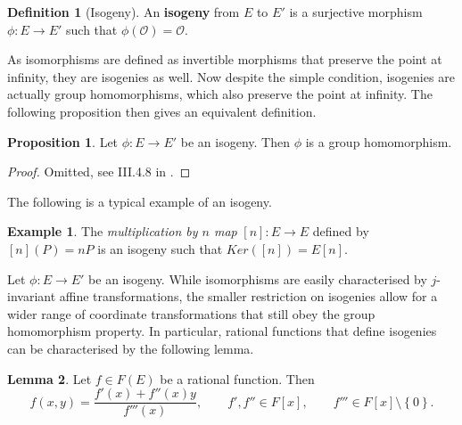 \documentclass{article}
\newcommand{\rb}[1]{\left( #1 \right)}
\renewcommand{\sb}[1]{\left[ #1 \right]}
\newcommand{\cb}[1]{\left\{ #1 \right\}}
\theoremstyle{definition}\newtheorem*{definition}{Definition}
\theoremstyle{definition}\newtheorem*{example}{Example}
\theoremstyle{definition}\newtheorem*{remark}{Remark}
\newtheorem{proposition}{Proposition}[subsection]
\newtheorem{lemma}[proposition]{Lemma}
\begin{document}
\begin{definition}[Isogeny]
An \textbf{isogeny} from $ E $ to $ E' $ is a surjective morphism $ \phi : E \to E' $ such that $ \phi\rb{\mathcal{O}} = \mathcal{O} $.
\end{definition}

As isomorphisms are defined as invertible morphisms that preserve the point at infinity, they are isogenies as well. Now despite the simple condition, isogenies are actually group homomorphisms, which also preserve the point at infinity. The following proposition then gives an equivalent definition.

\begin{proposition}
Let $ \phi : E \to E' $ be an isogeny. Then $ \phi $ is a group homomorphism.
\end{proposition}

\begin{proof}
Omitted, see III.4.8 in \cite{gtm}.
\end{proof}

The following is a typical example of an isogeny.

\begin{example}
The \emph{multiplication by $ n $ map} $ \sb{n} : E \to E $ defined by $ \sb{n}\rb{P} = nP $ is an isogeny such that $ Ker\rb{\sb{n}} = E\sb{n} $.
\end{example}

Let $ \phi : E \to E' $ be an isogeny. While isomorphisms are easily characterised by $ j $-invariant affine transformations, the smaller restriction on isogenies allow for a wider range of coordinate transformations that still obey the group homomorphism property. In particular, rational functions that define isogenies can be characterised by the following lemma.

\begin{lemma}
Let $ f \in F\rb{E} $ be a rational function. Then
$$ f\rb{x, y} = \dfrac{f'\rb{x} + f''\rb{x}y}{f'''\rb{x}}, \qquad f', f'' \in F\sb{x}, \qquad f''' \in F\sb{x} \setminus \cb{0}. $$
\end{lemma}
\end{document}
